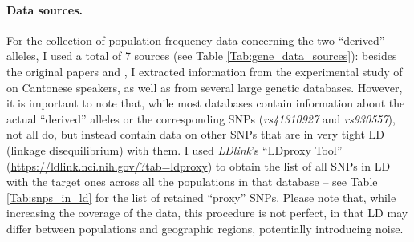 \documentclass[twoside,onecolumn]{article}
\begin{document}
\paragraph{Data sources.}
For the collection of population frequency data concerning the two ``derived'' alleles, I used a total of 7 sources (see Table \ref{Tab:gene_data_sources}): besides the original papers \citet{evans_microcephalin_2005} and \citet{mekelbobrov_aspm_2005}, I extracted information from the experimental study of \citet{wong_sciadv_2020} on Cantonese speakers, as well as from several large genetic databases.
However, it is important to note that, while most databases contain information about the actual ``derived'' alleles or the corresponding SNPs (\textit{rs41310927} and \textit{rs930557}), not all do, but instead contain data on other SNPs that are in very tight LD (linkage disequilibrium) with them.
I used \textit{LDlink}’s ``LDproxy Tool'' (\url{https://ldlink.nci.nih.gov/?tab=ldproxy}) to obtain the list of all SNPs in LD with the target ones across all the populations in that database -- see Table \ref{Tab:snps_in_ld} for the list of retained ``proxy'' SNPs.
Please note that, while increasing the coverage of the data, this procedure is not perfect, in that LD may differ between populations and geographic regions, potentially introducing noise.
\end{document}
